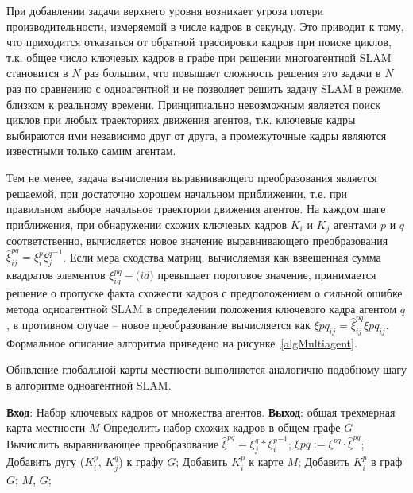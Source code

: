 При добавлении задачи верхнего уровня возникает угроза потери производительности, измеряемой в числе кадров в секунду. Это приводит к тому, что приходится отказаться от обратной трассировки кадров при поиске циклов, т.к. общее число ключевых кадров в графе при решении многоагентной SLAM становится в $N$ раз большим, что повышает сложность решения это задачи в $N$ раз по сравнению с одноагентной и не позволяет решить задачу SLAM в режиме, близком к реальному времени. Принципиально невозможным является поиск циклов при любых траекториях движения агентов, т.к. ключевые кадры выбираются ими независимо друг от друга, а промежуточные кадры являются известными только самим агентам.


Тем не менее, задача вычисления выравнивающего преобразования является решаемой, при достаточно хорошем начальном приближении, т.е. при правильном выборе начальное траектории движения агентов. На каждом шаге приближения, при обнаружении схожих ключевых кадров $K_i$ и $K_j$ агентами $p$ и $q$ соответственно, вычисляется новое значение выравнивающего преобразования $\hat \xi^{pq}_{ij} = \xi^p_i {\xi^q_j}^{-1}$. Если мера сходства матриц, вычисляемая как взвешенная сумма квадратов элементов $\xi^{pq}_{ig} - \mathrm(id)$ превышает пороговое значение, принимается решение о пропуске факта схожести кадров с предположением о сильной ошибке метода одноагентной SLAM в определении положения ключевого кадра  агентом $q$, в противном случае -- новое преобразование вычисляется как $\xi{pq}_{ij} = \hat \xi^{pq}_{ij} \xi{pq}_{ij}$. Формальное описание алгоритма приведено на рисунке~\ref{algMultiagent}.


Обнвление глобальной карты местности выполняется аналогично подобному шагу в алгоритме одноагентной SLAM.


\begin{algorithm}[H]
    \begin{algorithmic}
        \State \textbf{Вход}: Набор ключевых кадров от множества агентов. \textbf{Выход}: общая трехмерная карта местности $M$
            \State Определить набор схожих кадров в общем графе $G$
                \State Вычислить выравнивающее преобразование $\hat \xi^{pq} = \xi^q_j * {\xi^p_i}^{-1}$;
                    \State $\xi{pq} := \xi^{pq} \cdot \hat \xi^{pq}$;
                    \State Добавить дугу ($K^p_i$, $K^q_j$) к графу $G$;
                    \State Добавить $K^p_i$ к карте $M$;
                \EndIf
                \State Добавить $K^p_i$ в граф $G$;
            \EndFor
        \EndFor
        \State \Return $M$, $G$;
    \end{algorithmic}
\end{algorithm}


